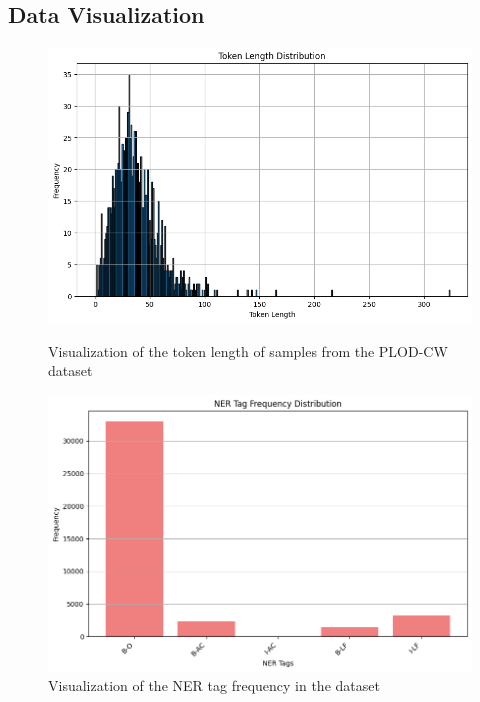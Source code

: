 \documentclass[a4paper,11pt]{article}
\begin{document}
\subsection{Data Visualization}
\begin{figure}[H]
	\centering
	\begin{minipage}[t]{0.48\textwidth}
		\centering
		\includegraphics[width=\textwidth]{./assets/token_len_hist.png}
		\caption{Visualization of the token length of samples from the PLOD-CW dataset}\label{fig:token_len_hist}
	\end{minipage}
	\hfill
	\begin{minipage}[t]{0.48\textwidth}
		\centering
		\includegraphics[width=\textwidth]{./assets/ner_tag_freq.png}
		\caption{Visualization of the NER tag frequency in the dataset}\label{fig:ner_tag_freq}
	\end{minipage}
\end{figure}
\end{document}
